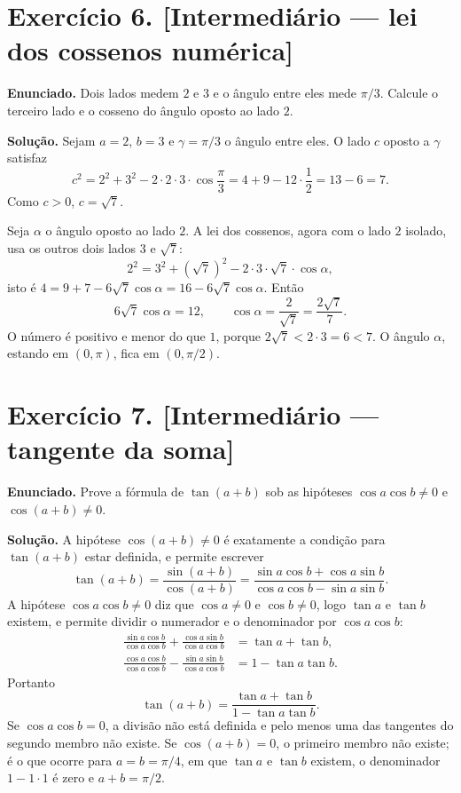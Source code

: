 \documentclass[11pt,a4paper]{article}
\begin{document}
\section*{Exercício 6. [Intermediário --- lei dos cossenos numérica]}

\textbf{Enunciado.} Dois lados medem $2$ e $3$ e o ângulo entre eles mede $\pi/3$. Calcule o terceiro lado e o cosseno do ângulo oposto ao lado $2$.

\textbf{Solução.}
Sejam $a=2$, $b=3$ e $\gamma=\pi/3$ o ângulo entre eles. O lado $c$ oposto a $\gamma$ satisfaz
\[
c^2=2^2+3^2-2\cdot 2\cdot 3\cdot\cos\frac{\pi}{3}
=4+9-12\cdot\frac12
=13-6=7.
\]
Como $c>0$, $c=\sqrt{7}$.

Seja $\alpha$ o ângulo oposto ao lado $2$. A lei dos cossenos, agora com o lado $2$ isolado, usa os outros dois lados $3$ e $\sqrt{7}$:
\[
2^2=3^2+(\sqrt{7})^2-2\cdot 3\cdot\sqrt{7}\cdot\cos\alpha,
\]
isto é $4=9+7-6\sqrt{7}\cos\alpha=16-6\sqrt{7}\cos\alpha$. Então
\[
6\sqrt{7}\cos\alpha=12,\qquad \cos\alpha=\frac{2}{\sqrt{7}}=\frac{2\sqrt{7}}{7}.
\]
O número é positivo e menor do que $1$, porque $2\sqrt{7}<2\cdot 3=6<7$. O ângulo $\alpha$, estando em $(0,\pi)$, fica em $(0,\pi/2)$.

\section*{Exercício 7. [Intermediário --- tangente da soma]}

\textbf{Enunciado.} Prove a fórmula de $\tan(a+b)$ sob as hipóteses $\cos a\cos b\neq 0$ e $\cos(a+b)\neq 0$.

\textbf{Solução.}
A hipótese $\cos(a+b)\neq 0$ é exatamente a condição para $\tan(a+b)$ estar definida, e permite escrever
\[
\tan(a+b)=\frac{\sin(a+b)}{\cos(a+b)}
=\frac{\sin a\cos b+\cos a\sin b}{\cos a\cos b-\sin a\sin b}.
\]
A hipótese $\cos a\cos b\neq 0$ diz que $\cos a\neq 0$ e $\cos b\neq 0$, logo $\tan a$ e $\tan b$ existem, e permite dividir o numerador e o denominador por $\cos a\cos b$:
\begin{align*}
\frac{\sin a\cos b}{\cos a\cos b}+\frac{\cos a\sin b}{\cos a\cos b}
&=\tan a+\tan b,\\[0.3em]
\frac{\cos a\cos b}{\cos a\cos b}-\frac{\sin a\sin b}{\cos a\cos b}
&=1-\tan a\tan b.
\end{align*}
Portanto
\[
\tan(a+b)=\frac{\tan a+\tan b}{1-\tan a\tan b}.
\]
Se $\cos a\cos b=0$, a divisão não está definida e pelo menos uma das tangentes do segundo membro não existe. Se $\cos(a+b)=0$, o primeiro membro não existe; é o que ocorre para $a=b=\pi/4$, em que $\tan a$ e $\tan b$ existem, o denominador $1-1\cdot 1$ é zero e $a+b=\pi/2$.
\end{document}
